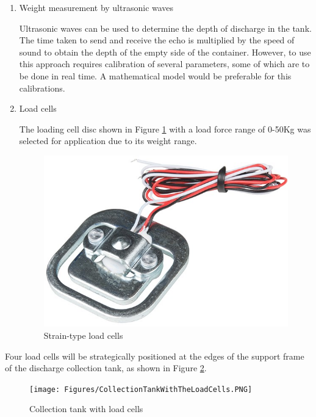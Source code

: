 \begin{enumerate}
    \item Weight measurement by ultrasonic waves
    \par
    Ultrasonic waves can be used to determine the depth of discharge in the tank. The time taken to send and receive the echo is multiplied by the speed of sound to obtain the depth of the empty side of the container. However, to use this approach requires calibration of several parameters, some of which are to be done in real time. A mathematical model would be preferable for this calibrations. 
   
    \item Load cells
    \par
    The loading cell disc shown in Figure \ref{fig:load_cell_disc} with a load force range of 0-50Kg was selected for application due to its weight range.
    \begin{figure}[H]
        \centering
        \includegraphics[width=.25\textwidth, height=.25\textheight]{Figures/50KgLoadCell.jpg}
        \caption[Strain-type load cells]{Strain-type load cells \cite{loadcell}}
        \label{fig:load_cell_disc}
    \end{figure}
\end{enumerate}
 Four load cells  will be strategically positioned at the edges of the support frame of the discharge collection tank, as shown in Figure \ref{fig:collection_tank_with_load_cells}.
\begin{figure}[H]
    \centering
    \texttt{[image: Figures/CollectionTankWithTheLoadCells.PNG]}
    \caption{Collection tank with load cells}
    \label{fig:collection_tank_with_load_cells}
\end{figure}


